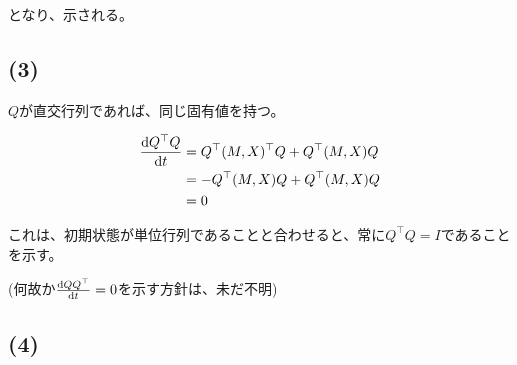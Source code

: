 \documentclass[a4paper, 10pt, dvipdfmx]{jlreq}
\begin{document}
となり、示される。

\subsection*{(3)}

$Q$が直交行列であれば、同じ固有値を持つ。

\begin{align*}
  \dv{Q^\top Q}{t} & =Q^\top (M,X)^\top Q+Q^\top (M,X)Q \\
                   & =-Q^\top (M,X)Q+Q^\top (M,X)Q      \\
                   & =0
\end{align*}

これは、初期状態が単位行列であることと合わせると、常に$Q^\top Q=I$であることを示す。

(何故か$\dv{QQ^\top }{t}=0$を示す方針は、未だ不明)

\subsection*{(4)}
\end{document}
